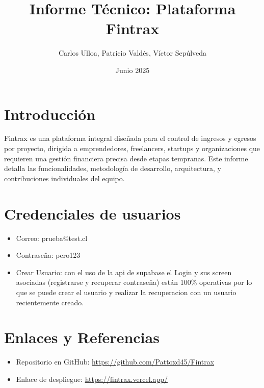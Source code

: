\documentclass[12pt, a4paper]{article}
\title{Informe Técnico: Plataforma Fintrax}
\author{Carlos Ulloa, Patricio Valdés, Víctor Sepúlveda}
\date{Junio 2025}
\begin{document}
\begin{titlepage}
    \maketitle
    \thispagestyle{empty} %
\end{titlepage}
\newpage
\tableofcontents
\thispagestyle{empty} %
\newpage
\section{Introducción}
Fintrax es una plataforma integral diseñada para el control de ingresos y egresos por proyecto, dirigida a emprendedores, freelancers, startups y organizaciones que requieren una gestión financiera precisa desde etapas tempranas. Este informe detalla las funcionalidades, metodología de desarrollo, arquitectura, y contribuciones individuales del equipo.
\newpage

% 
% 
% 
% 

% 

%

% 

%  

\section{Credenciales de usuarios}
\begin{itemize}
    \item Correo: prueba@test.cl
    \item Contraseña: pero123
    \item Crear Usuario: con el uso de la api de supabase el Login y sus screen asociadas (registrarse y recuperar contraseña) están 100\% operativas por lo que se puede crear el usuario y realizar la recuperacion con un usuario recientemente creado.
\end{itemize}
\section{Enlaces y Referencias}
\begin{itemize}
    \item Repositorio en GitHub: \url{https://github.com/Pattoxd45/Fintrax}
    \item Enlace de despliegue: \url{https://fintrax.vercel.app/}
\end{itemize}
\end{document}
